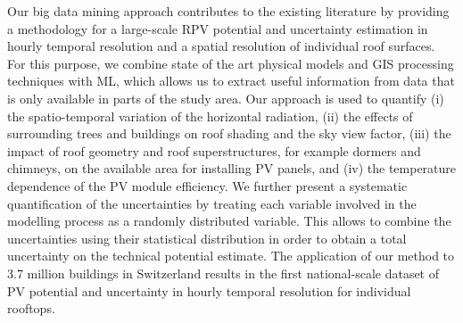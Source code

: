 Our big data mining approach contributes to the existing literature by providing a methodology for a large-scale RPV potential and uncertainty estimation in hourly temporal resolution and a spatial resolution of individual roof surfaces. 
For this purpose, we combine state of the art physical models and GIS processing techniques with ML, 
which allows us to extract useful information from data that is only available in parts of the study area.
Our approach is used to quantify
(i) the spatio-temporal variation of the horizontal radiation, 
(ii) the effects of surrounding trees and buildings on roof shading and the sky view factor, 
(iii) the impact of roof geometry and roof superstructures, for example dormers and chimneys, on the available area for installing PV panels, 
and (iv) the temperature dependence of the PV module efficiency. 
We further present a systematic quantification of the uncertainties by treating each variable involved in the modelling process as a randomly distributed variable.
This allows to combine the uncertainties using their statistical distribution in order to obtain a total uncertainty on the technical potential estimate. 
The application of our method to 3.7 million buildings in Switzerland results in the first national-scale dataset of PV potential and uncertainty in hourly temporal resolution for individual rooftops. 

